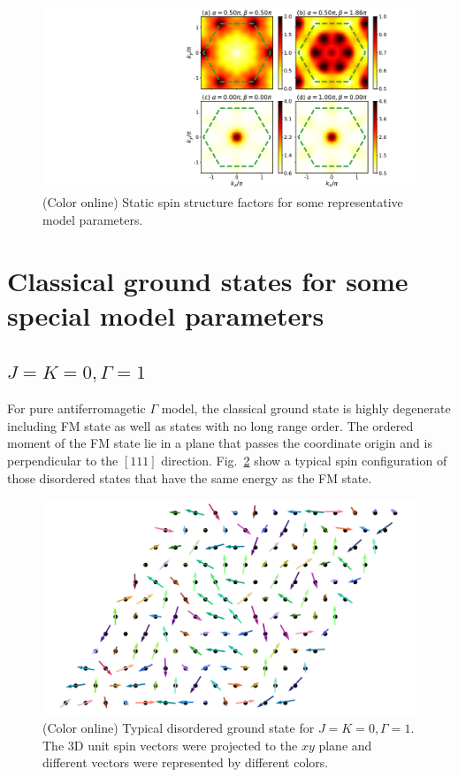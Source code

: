 \documentclass[aps,prb,reprint,amsfonts,amsmath,amssymb,showpacs,groupedaddress,superscriptaddress]{revtex4-1}
\begin{document}
\begin{figure}
    \centering
    \includegraphics[width=\columnwidth]{fig/AppendixSSF.pdf}
    \caption{\label{fig:AppendixSSF}(Color online) Static spin structure factors for some representative model parameters.}
\end{figure}

\section{\label{apx:AppendixC}Classical ground states for some special model parameters}

\subsection{$J=K=0, \Gamma=1$}
For pure antiferromagetic $\Gamma$ model, the classical ground state is highly degenerate including FM state as well as states with no long range order. The ordered moment of the FM state lie in a plane that passes the coordinate origin and is perpendicular to the $[111]$ direction. Fig.~\ref{fig:GSForPositiveGamma} show a typical spin configuration of those disordered states that have the same energy as the FM state.
\begin{figure}
    \centering
    \includegraphics[width=\columnwidth]{fig/SpinConfigForPositiveGamma.pdf}
    \caption{\label{fig:GSForPositiveGamma}(Color online) Typical disordered ground state for $J=K=0, \Gamma=1$. The 3D unit spin vectors were projected to the $xy$ plane and different vectors were represented by different colors.}
\end{figure}
\end{document}

